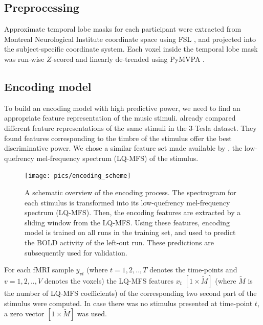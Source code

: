 \subsection*{Preprocessing}

Approximate temporal lobe masks for each participant were extracted from Montreal
Neurological Institute coordinate space using FSL \citep{SJB+04,JBB+12}, and
projected into the subject-specific coordinate system.
Each voxel inside the temporal lobe mask was run-wise $Z$-scored and linearly
de-trended using PyMVPA \citep{HHS09b}. 

\subsection*{Encoding model}

To build an encoding model with high predictive power, we need to find an
appropriate feature representation of the music stimuli.  \citet{CTK+2012}
already compared different feature representations of the same stimuli in the
3-Tesla dataset. They found features corresponding to the timbre of the stimulus
offer the best discriminative power.
We chose a similar feature set made available by \citet{HDH+2015}, the low-quefrency
mel-frequency spectrum (LQ-MFS) of the stimulus.

\begin{figure}
  \centering
  \texttt{[image: pics/encoding\_scheme]}

  \caption{A schematic overview of the encoding process. The spectrogram for
	  each stimulus is transformed into its low-quefrency mel-frequency
	  spectrum (LQ-MFS). Then, the encoding features are extracted by a
  sliding window from the LQ-MFS. Using these features, encoding model is trained on all runs in
  the training set, and used to predict the BOLD activity of the left-out run.
  These predictions are subsequently used for validation.}

 \label{fig:encoding_scheme}
\end{figure}


For each f{MRI} sample $y_{vt}$ (where $t=1,2,..,T$ denotes the time-points and
$v=1,2,..,V$ denotes the voxels) the LQ-MFS features $x_{t}$ $[1\times\widetilde{M}]$
(where $\widetilde{M}$ is the number of LQ-MFS coefficients) of the
corresponding two second part of the stimulus were computed. In case there was
no stimulus presented at time-point $t$, a zero vector $[1\times\widetilde{M}]$ was
used. 

